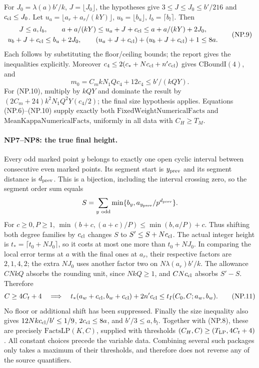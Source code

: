 \documentclass[11pt,a4paper]{article}
\numberwithin{equation}{section}
\theoremstyle{remark}\newtheorem{remark}[theorem]{Remark}
\begin{document}
For $J_0=\lambda(a)b'/k$, $J=\lfloor J_0\rfloor$, the hypotheses give
$3\le J\le J_0\le b'/216$ and $c_{\rm cl}\le J_0$.
Let $u_a=\lfloor a_r+a_r/(kY)\rfloor$, $u_b=\lfloor b_u\rfloor$,
$l_b=\lceil b_l\rceil$. Then
\[
 \begin{gathered}
 J\le a,l_b,\qquad
 a+a/(kY)\le u_a+J+c_{\rm cl}\le a+a/(kY)+2J_0,\\
 u_b+J+c_{\rm cl}\le b_u+2J_0,\qquad
 (u_a+J+c_{\rm cl})+(u_b+J+c_{\rm cl})+1\le8a.
 \end{gathered}                                      \tag{NP.9}
\]
Each follows by substituting the floor/ceiling bounds; the report gives
the inequalities explicitly. Moreover $c_4\le2(c_*+Nc_{\rm cl}+n'c_{\rm cl})$
gives $\mathrm{CBoundI}(4)$, and
\[
 m_0=C_mkN_1Qc_4+12c_4\le b'/(kQY).                 \tag{NP.10}
\]
For (NP.10), multiply by $kQY$ and dominate the result by
$(2C_m+24)k^2N_1Q^2Y(c_4/2)$; the final size hypothesis applies.
Equations (NP.6)--(NP.10) supply exactly both
$\mathrm{FixedWeightNumericalFacts}$ and $\mathrm{MeanKappaNumericalFacts}$,
uniformly in all data with $C_H\ge T_M$.

\paragraph{NP7--NP8: the true final height.}
Every odd marked point $y$ belongs to exactly one open cyclic interval
between consecutive even marked points. Its segment start is
$y_{\rm prev}$ and its segment distance is $d_{\rm prev}$.
This is a bijection, including the interval crossing zero, so the
segment order sum equals
\[
 S=\sum_{y\ {\rm odd}}\min\{b_y,a_{y_{\rm prev}}/p^{d_{\rm prev}}\}.
\]
For $c\ge0,P\ge1$,
$\min(b+c,(a+c)/P)\le\min(b,a/P)+c$.
Thus shifting both degree families by $c_{\rm cl}$ changes $S$ to
$S'\le S+Nc_{\rm cl}$.
The actual integer height is $t_*=\lceil t_0+NJ_0\rceil$,
so it costs at most one more than $t_0+NJ_0$.
In comparing the local error terms at $a$ with the final ones at $a_r$,
their respective factors are $2,1,4,2$; the extra $NJ_0$ uses another
factor two on $N\lambda(a_r)b'/k$.
The allowance $CNkQ$ absorbs the rounding unit, since $NkQ\ge1$,
and $CNc_{\rm cl}$ absorbs $S'-S$. Therefore
\[
 C\ge4C_t+4\quad\Longrightarrow\quad
 t_*(a_w+c_{\rm cl},b_w+c_{\rm cl})+2n'c_{\rm cl}
       \le t_I(C_0,C;a_w,b_w).                      \tag{NP.11}
\]
No floor or additional shift has been suppressed.
Finally the size inequality also gives
$12Nkc_{\rm cl}/b'\le1/9$, $2c_{\rm cl}\le8a$,
and $b'/3\le a,b_l$. Together with (NP.8), these are precisely
$\mathrm{FactsLP}(K,C)$, supplied with thresholds
$(C_H,C)\ge(T_{\rm LP},4C_t+4)$.
All constant choices precede the variable data. Combining several such
packages only takes a maximum of their thresholds, and therefore does
not reverse any of the source quantifiers.
\end{document}
